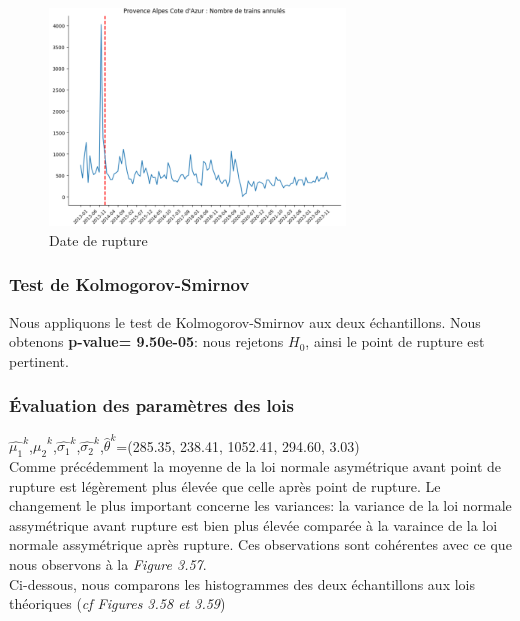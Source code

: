 {\begin{figure}[H]
  \centering
  \includegraphics[width=0.7\textwidth]{PACA_TA_3.png}
  \caption{Date de rupture}
\end{figure}

\subsubsection{Test de Kolmogorov-Smirnov}

Nous appliquons le test de Kolmogorov-Smirnov aux deux échantillons. Nous obtenons \textbf{p-value= 9.50e-05}: nous rejetons $H_0$, ainsi le point de rupture est pertinent.
\subsubsection{Évaluation des paramètres des lois}

$\hat{\mu_1}^k$,$\hat{\mu_2}^k$,$\hat{\sigma_1}^k$,$\hat{\sigma_2}^k$,$\hat{\theta}^k$=(285.35, 238.41, 1052.41, 294.60, 3.03)\\

Comme précédemment la moyenne de la loi normale asymétrique avant point de rupture est légèrement plus élevée que celle après point de rupture. Le changement le plus important concerne les variances: la variance de la loi normale assymétrique avant rupture est bien plus élevée comparée à la varaince de la loi normale assymétrique après rupture. Ces observations sont cohérentes avec ce que nous observons à la \textit{Figure 3.57}.\\

Ci-dessous, nous comparons les histogrammes des deux échantillons aux lois théoriques (\textit{cf Figures 3.58 et 3.59})

}
